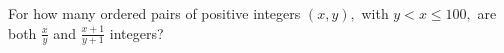 For how many ordered pairs of positive integers $(x,y),$ with $y<x\le 100,$ are both $\frac xy$ and $\frac{x+1}{y+1}$ integers?